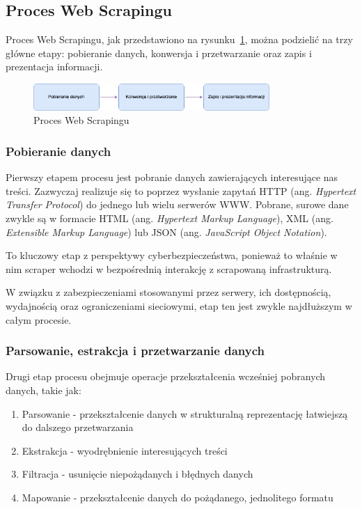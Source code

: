 \subsection{Proces Web Scrapingu}\label{subsec:web-scraping-process}

Proces Web Scrapingu, jak przedstawiono na rysunku~\ref{fig:scraping-process}, można podzielić na trzy główne etapy: pobieranie danych, konwersja i przetwarzanie oraz zapis i prezentacja informacji\cite{persson}.

\begin{figure}[H]
    \centering
    \includegraphics[width=0.8\textwidth]{img/scraping-process}
    \caption{Proces Web Scrapingu}
    \label{fig:scraping-process}
\end{figure}

\subsubsection{Pobieranie danych}

Pierwszy etapem procesu jest pobranie danych zawierających interesujące nas treści.
Zazwyczaj realizuje się to poprzez wysłanie zapytań HTTP (ang. \emph{Hypertext Transfer Protocol}) do jednego lub wielu serwerów WWW\@.
Pobrane, surowe dane zwykle są w formacie HTML (ang. \emph{Hypertext Markup Language}), XML (ang. \emph{Extensible Markup Language}) lub JSON (ang. \emph{JavaScript Object Notation}).

To kluczowy etap z perspektywy cyberbezpieczeństwa, ponieważ to właśnie w nim scraper wchodzi w bezpośrednią interakcję z scrapowaną infrastrukturą.

W związku z zabezpieczeniami stosowanymi przez serwery, ich dostępnością, wydajnością oraz ograniczeniami sieciowymi, etap ten jest zwykle najdłuższym w całym procesie.

\subsubsection{Parsowanie, estrakcja i przetwarzanie danych}

Drugi etap procesu obejmuje operacje przekształcenia wcześniej pobranych danych, takie jak:
\begin{enumerate}
    \item Parsowanie - przekształcenie danych w strukturalną reprezentację łatwiejszą do dalszego przetwarzania
    \item Ekstrakcja - wyodrębnienie interesujących treści
    \item Filtracja - usunięcie niepożądanych i błędnych danych
    \item Mapowanie - przekształcenie danych do pożądanego, jednolitego formatu
\end{enumerate}

